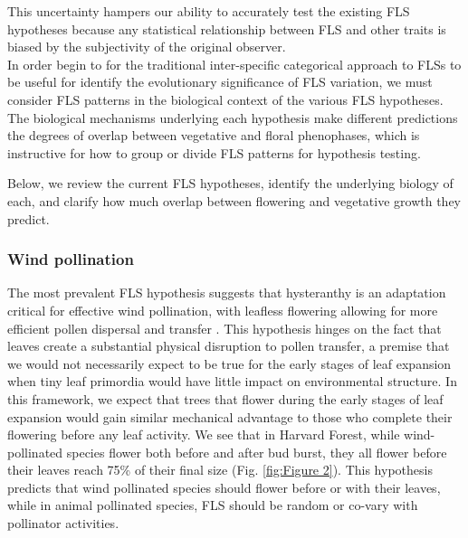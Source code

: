 \documentclass[12pt]{article}\usepackage[]{graphicx}\usepackage[]{color}
\begin{document}
This uncertainty hampers our ability to accurately test the existing FLS hypotheses because any statistical relationship between FLS and other traits is biased by the subjectivity of the original observer.\\

\indent In order begin to  for the traditional inter-specific categorical approach to FLSs to be useful for identify the evolutionary significance of FLS variation, we must consider FLS patterns in the biological context of the various FLS hypotheses. The biological mechanisms underlying each hypothesis make different predictions the degrees of overlap between vegetative and floral phenophases, which is instructive for how to group or divide FLS patterns for hypothesis testing.


Below, we review the current FLS hypotheses, identify the underlying biology of each, and clarify how much overlap between flowering and vegetative growth they predict.
\subsubsection*{ Wind pollination}

\indent\indent The most prevalent FLS hypothesis suggests that hysteranthy is an adaptation critical for effective wind pollination, with leafless flowering allowing for more efficient pollen dispersal and transfer \citep{Whitehead1969, Spurr1980,Friedman2009}. %
 This hypothesis hinges on the fact that leaves create a substantial physical disruption to pollen transfer, a premise that we would not necessarily expect to be true for the early stages of leaf expansion when tiny leaf primordia would have little impact on environmental structure. In this framework, we expect that trees that flower during the early stages of leaf expansion would gain similar mechanical advantage to those who complete their flowering before any leaf activity. We see that in Harvard Forest, while wind-pollinated species flower both before and after bud burst, they all flower before their leaves reach 75\% of their final size (Fig. \ref{fig:Figure 2}). This hypothesis predicts that wind pollinated species should flower before or with their leaves, while in animal pollinated species, FLS should be random or co-vary with pollinator activities.
\end{document}
